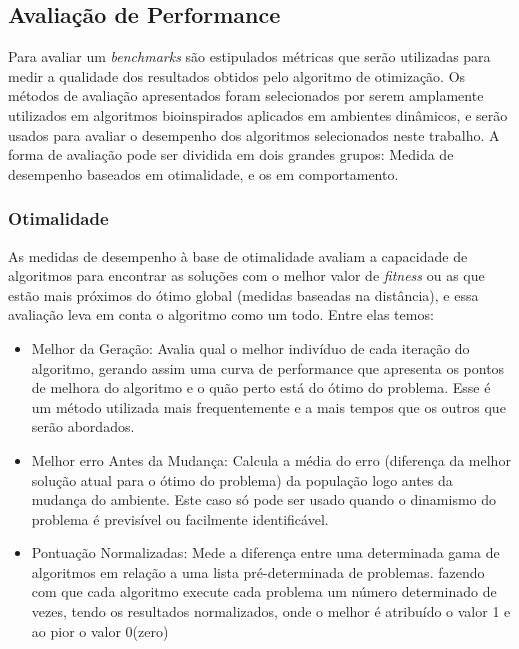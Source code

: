 \subsection{Avaliação de Performance}
\label{sec:perfermance_measures}

Para avaliar um \textit{benchmarks} são estipulados métricas que serão utilizadas para medir a qualidade dos resultados obtidos pelo algoritmo de otimização. Os métodos de avaliação apresentados foram selecionados por serem amplamente utilizados em algoritmos bioinspirados aplicados em ambientes dinâmicos, e serão usados para avaliar o desempenho dos algoritmos selecionados neste trabalho.
A forma de avaliação pode ser dividida em dois grandes grupos: Medida de desempenho baseados em otimalidade, e os em comportamento.

\subsubsection{Otimalidade}
As medidas de desempenho à base de otimalidade avaliam a capacidade de algoritmos para encontrar as soluções com o melhor valor de \textit{fitness} ou as que estão mais próximos do ótimo global (medidas baseadas na distância), e essa avaliação leva em conta o algoritmo como um todo. Entre elas temos:

\begin{itemize}
\item Melhor da Geração: Avalia qual o melhor indivíduo de cada iteração do algoritmo, gerando assim uma curva de performance que apresenta os pontos de melhora do algoritmo e o quão perto está do ótimo do problema. Esse é um método utilizada mais frequentemente e a mais tempos que os outros que serão abordados.

\item Melhor erro Antes da Mudança: Calcula a média do erro (diferença da melhor solução atual para o ótimo do problema) da população logo antes da mudança do ambiente. Este caso só pode ser usado quando o dinamismo do problema é previsível ou facilmente identificável.

\item Pontuação Normalizadas: Mede a diferença entre uma determinada gama de algoritmos em relação a uma lista pré-determinada de problemas. fazendo com que cada algoritmo execute cada problema um número determinado de vezes, tendo os resultados normalizados, onde o melhor é atribuído o valor 1 e ao pior o valor 0(zero)
\end{itemize}

